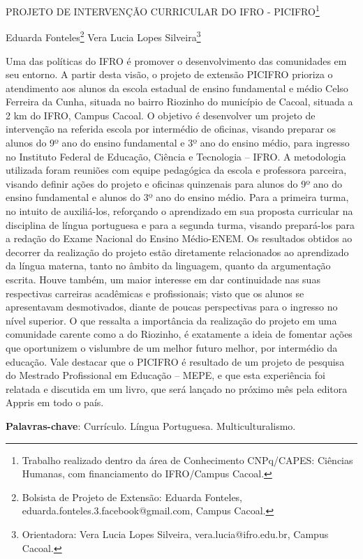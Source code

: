 \documentclass[article,12pt,onesidea,4paper,english,brazil]{abntex2}
\begin{document}
	
	
	\frenchspacing 
	
	\begin{center}
		\LARGE PROJETO DE INTERVENÇÃO CURRICULAR DO IFRO - PICIFRO\footnote{Trabalho realizado dentro da área de Conhecimento CNPq/CAPES: Ciências Humanas, com financiamento do IFRO/Campus Cacoal. }
		
		\normalsize
		Eduarda Fonteles\footnote{Bolsista de Projeto de Extensão: Eduarda Fonteles,  eduarda.fonteles.3.facebook@gmail.com, Campus Cacoal.} 
		Vera Lucia Lopes Silveira\footnote{Orientadora: Vera Lucia Lopes Silveira, vera.lucia@ifro.edu.br, Campus Cacoal.} 
	\end{center}
	
	\noindent Uma das políticas do IFRO é promover o desenvolvimento das comunidades em seu entorno. A partir desta visão, o projeto de extensão PICIFRO prioriza o atendimento aos alunos da escola estadual de ensino fundamental e médio Celso Ferreira da Cunha, situada no bairro Riozinho do município de Cacoal, situada a 2 km do IFRO, Campus Cacoal. O objetivo é desenvolver um projeto de intervenção na referida escola por intermédio de oficinas, visando preparar os alunos do 9º ano do ensino fundamental e 3º ano do ensino médio, para ingresso no Instituto Federal de Educação, Ciência e Tecnologia – IFRO.  A metodologia utilizada foram reuniões com equipe pedagógica da escola e professora parceira, visando definir ações do projeto e oficinas quinzenais para alunos do 9º ano do ensino fundamental e alunos do 3º ano do ensino médio. Para a primeira turma, no intuito de auxiliá-los, reforçando o aprendizado em sua proposta curricular na disciplina de língua portuguesa e para a segunda turma, visando prepará-los para a redação do Exame Nacional do Ensino Médio-ENEM. 
	Os resultados obtidos ao decorrer da realização do projeto estão diretamente relacionados ao aprendizado da língua materna, tanto no âmbito da linguagem, quanto da argumentação escrita. Houve também, um maior interesse em dar continuidade nas suas respectivas carreiras acadêmicas e profissionais; visto que os alunos se apresentavam desmotivados, diante de poucas perspectivas para o ingresso no nível superior. O que ressalta a importância da realização do projeto em uma comunidade carente como a do Riozinho, é exatamente a ideia de fomentar ações que oportunizem o vislumbre de um melhor futuro melhor, por intermédio da educação. 
	Vale destacar que o PICIFRO é resultado de um projeto de pesquisa do Mestrado Profissional em Educação – MEPE, e que esta experiência foi relatada e discutida em um livro, que será lançado no próximo mês pela editora Appris em todo o país.
	
	
	\vspace{\onelineskip}
	
	\noindent
	\textbf{Palavras-chave}: Currículo. Língua Portuguesa. Multiculturalismo.
	
\end{document}
